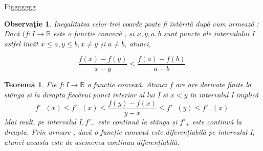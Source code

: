 \documentclass[a4paper,12pt,oneside]{report}
\newtheorem{theorem}{Teorem\u a}
\newtheorem{remark}{Observa\c{t}ie}
\begin{document}
Figgggggg


\begin{remark}
Inegalitatea celor trei coarde poate fi întărită după cum urmează : Dacă \((f : I \rightarrow \mathbb{R}\) este o funcție convexă , și \(x,y,a,b\) sunt puncte ale intervalului I astfel încât \(x \leq a, y\leq b, x \neq y\) și \(a \neq b\), atunci,
\end{remark}
\begin{displaymath}
   \frac{f\left ( x \right )- f\left ( y \right )}{x-y}\leq \frac{f\left ( a \right )- f\left ( b \right )}{a-b}. 
\end{displaymath}
\begin{theorem} \label{Teorema 7} 
Fie \(f : I \rightarrow \mathbb{R}\) o funcție convexă. Atunci \(f\) are are derivate finite la stânga și la dreapta fiecărui punct interior al lui I și \(x <y\) în intervalul I implică
\begin{displaymath}
   {f}'_{-}\left ( x \right )\leq {f}'_{+}\left ( x \right )\leq \frac{f\left ( y \right )-f\left ( x \right )}{y-x}\leq {f}'_{-}\left ( y \right )\leq {f}'_{+}\left ( x \right ).
\end{displaymath}
Mai mult, pe intervalul \(I, {f}'_{-}\) este continuă la stânga și \({f}'_{+}\) este continuă la dreapta. 
	Prin urmare , dacă o funcție convexă este diferențiabilă pe intervalul I, atunci aceasta este de asemenea continuu diferențiabilă. 
\end{theorem}
\end{document}
